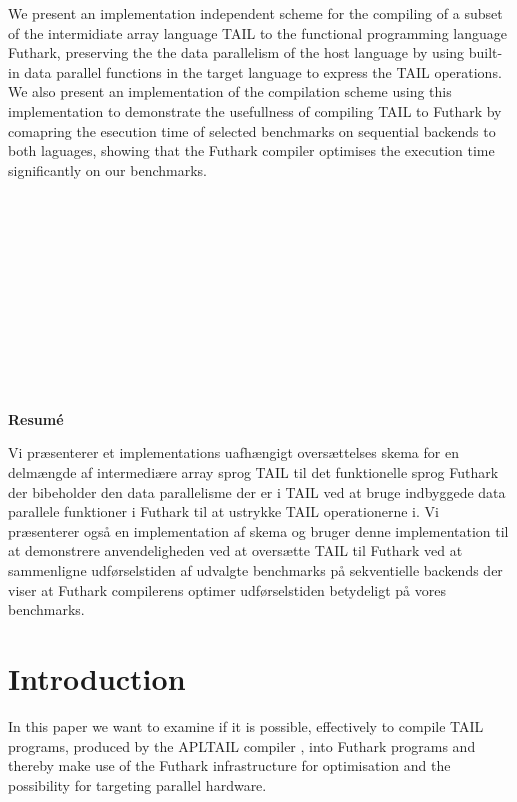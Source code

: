 \documentclass[11pt]{article}
\begin{document}
We present an implementation independent scheme for the compiling of a subset of the intermidiate array language TAIL
 to the functional programming language Futhark, 
 preserving the the data parallelism of the host language by using built-in data parallel functions in the target language to express the TAIL operations. We also present an implementation of the compilation scheme using this implementation to demonstrate the usefullness of compiling TAIL to Futhark by comapring the esecution time of selected benchmarks on sequential backends to both laguages, showing that the Futhark compiler optimises the execution time significantly on our benchmarks. \\\\\\\\\\\\\\\\\\\\\\\\

\begin{center}
\textbf{Resumé}
\end{center}
Vi præsenterer et implementations uafhængigt oversættelses skema for en delmængde af intermediære array sprog TAIL til det funktionelle sprog Futhark der bibeholder den data parallelisme der er i TAIL ved at bruge indbyggede data parallele funktioner i Futhark til at ustrykke TAIL operationerne i. Vi præsenterer også en implementation af skema og bruger denne implementation til at demonstrere anvendeligheden ved at oversætte TAIL til Futhark ved at sammenligne udførselstiden af udvalgte benchmarks på sekventielle backends der viser at Futhark compilerens optimer udførselstiden betydeligt på vores benchmarks.

\newpage

\tableofcontents

\newpage

\section{Introduction}
In this paper we want to examine if it is possible, effectively to compile TAIL programs, produced by the APLTAIL compiler \cite{ElsmanDybdal:Array:2014}, into Futhark programs \cite{TroelsHenriksen} and thereby make use of the Futhark infrastructure for optimisation and the possibility for targeting parallel hardware.
\end{document}
